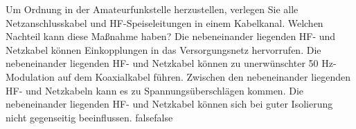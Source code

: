     {Um Ordnung in der Amateurfunkstelle herzustellen, verlegen Sie alle Netzanschlusskabel und HF-Speiseleitungen in einem Kabelkanal. Welchen Nachteil kann diese Maßnahme haben?}
    {Die nebeneinander liegenden HF- und Netzkabel können Einkopplungen in das Versorgungsnetz hervorrufen.}
    {Die nebeneinander liegenden HF- und Netzkabel können zu unerwünschter 50 Hz-Modulation auf dem Koaxialkabel führen.}
    {Zwischen den nebeneinander liegenden HF- und Netzkabeln kann es zu Spannungsüberschlägen kommen.}
    {Die nebeneinander liegenden HF- und Netzkabel können sich bei guter Isolierung nicht gegenseitig beeinflussen.}
    {false}{false}